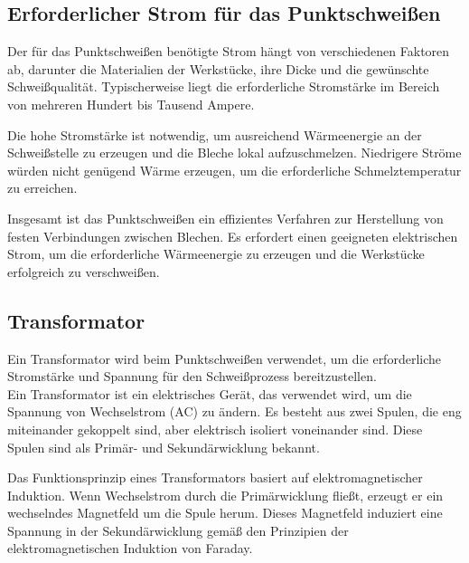 \subsection{Erforderlicher Strom für das Punktschweißen}

Der für das Punktschweißen benötigte Strom hängt von verschiedenen Faktoren ab, darunter die Materialien der Werkstücke, ihre Dicke und die gewünschte Schweißqualität. Typischerweise liegt die erforderliche Stromstärke im Bereich von mehreren Hundert bis Tausend Ampere.

Die hohe Stromstärke ist notwendig, um ausreichend Wärmeenergie an der Schweißstelle zu erzeugen und die Bleche lokal aufzuschmelzen. Niedrigere Ströme würden nicht genügend Wärme erzeugen, um die erforderliche Schmelztemperatur zu erreichen.

Insgesamt ist das Punktschweißen ein effizientes Verfahren zur Herstellung von festen Verbindungen zwischen Blechen. Es erfordert einen geeigneten elektrischen Strom, um die erforderliche Wärmeenergie zu erzeugen und die Werkstücke erfolgreich zu verschweißen.



\subsection*{Transformator}

Ein Transformator wird beim Punktschweißen verwendet, um die erforderliche Stromstärke und Spannung für den Schweißprozess bereitzustellen.\\

Ein Transformator ist ein elektrisches Gerät, das verwendet wird, um die Spannung von Wechselstrom (AC) zu ändern. Es besteht aus zwei Spulen, die eng miteinander gekoppelt sind, aber elektrisch isoliert voneinander sind. Diese Spulen sind als Primär- und Sekundärwicklung bekannt.


Das Funktionsprinzip eines Transformators basiert auf elektromagnetischer Induktion. Wenn Wechselstrom durch die Primärwicklung fließt, erzeugt er ein wechselndes Magnetfeld um die Spule herum. Dieses Magnetfeld induziert eine Spannung in der Sekundärwicklung gemäß den Prinzipien der elektromagnetischen Induktion von Faraday.


